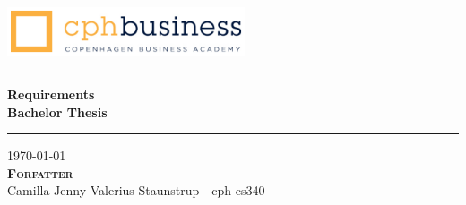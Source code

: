 
\begin{titlepage}
\begin{center}

\vspace*{4cm}
\includegraphics[width=7cm]{./figures/cphlogo.png}
\vspace*{2cm}

\hrule
\vspace{.5cm}
{ \huge \bfseries Requirements\\ Bachelor Thesis} 
\vspace{.5cm}
\hrule

\vspace{1cm}
\centering \today\\
\vspace{0.5cm}
\textsc{\textbf{Forfatter}}\\

\centering
Camilla Jenny Valerius Staunstrup - cph-cs340

\vspace{10cm}


\end{center}
\end{titlepage}